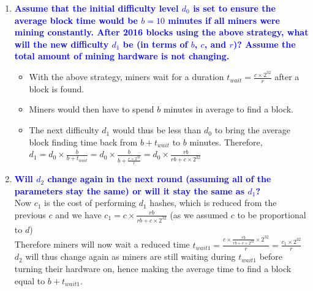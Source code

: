 \documentclass[11pt]{article}
\begin{document}
\begin{enumerate}
\begin{enumerate}
    \item \textbf{\textcolor{blue}{Assume that the initial difficulty level $d_0$ is set to ensure the average block time would be $b=10$ minutes if all miners were mining constantly. After 2016 blocks using the above strategy, what will the new difficulty $d_1$ be (in terms of $b$, $c$, and $r$)? Assume the total amount of mining hardware is not changing.}}
        \begin{itemize}
            \item With the above strategy, miners wait for a duration $t_{wait} = \frac{c \times 2^{32}}{r}$ after a block is found.
            \item Miners would then have to spend $b$ minutes in average to find a block.
            \item The next difficulty $d_1$ would thus be less than $d_0$ to bring the average block finding time back from $b+t_{wait}$ to $b$ minutes. Therefore, $d_1 = d_0 \times \frac{b}{b+t_{wait}} = d_0 \times \frac{b}{b + \frac{c \times 2^{32}}{r}} = d_0 \times \frac{rb}{rb + c \times 2^{32}}$
        \end{itemize}
        
    \item \textbf{\textcolor{blue}{Will $d_2$ change again in the next round (assuming all of the parameters stay the same) or will it stay the same as $d_1$?}}
        \\ Now $c_1$ is the cost of performing $d_1$ hashes, which is reduced from the previous $c$ and we have $c_1 = c \times \frac{rb}{rb + c \times 2^{32}}$ (as we assumed $c$ to be proportional to $d$)
        \\ Therefore miners will now wait a reduced time $t_{wait1} = \frac{c \times \frac{rb}{rb + c \times 2^{32}} \times 2^{32}}{r} = \frac{c_1 \times 2^{32}}{r}$
        \\ $d_2$ will thus change again as miners are still waiting during $t_{wait1}$ before turning their hardware on, hence making the average time to find a block equal to $b + t_{wait1}$.
        

\end{enumerate}
\end{enumerate}
\end{document}
